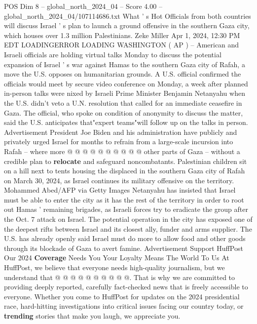 \begin{textsample}{POS Dim 8 – global\_north\_2024\_04 – Score 4.00 – global\_north\_2024\_04/107114686.txt}  \label{ex:f8_pos_319}
What ' s Hot Officials from both countries will discuss Israel ' s plan to launch a ground offensive in the southern Gaza city, which houses over 1.3 million Palestinians.
Zeke Miller Apr 1, 2024, 12:30 PM EDT LOADINGERROR LOADING WASHINGTON ( AP ) -- American and Israeli officials are holding virtual talks Monday to discuss the potential expansion of Israel ' s war against Hamas to the southern Gaza city of Rafah, a move the U.S. opposes on humanitarian grounds.
A U.S. official confirmed the officials would meet by secure video conference on Monday, a week after planned in-person talks were nixed by Israeli Prime Minister Benjamin Netanyahu when the U.S. didn't veto a U.N. resolution that called for an immediate ceasefire in Gaza.
The official, who spoke on condition of anonymity to discuss the matter, said the U.S. anticipates that"expert teams"will follow up on the talks in person.
Advertisement President Joe Biden and his administration have publicly and privately urged Israel for months to refrain from a large-scale incursion into Rafah -- where more @ @ @ @ @ @ @ @ @ @ other parts of Gaza -- without a credible plan to \textbf{relocate} and safeguard noncombatants.
Palestinian children sit on a hill next to tents housing the displaced in the southern Gaza city of Rafah on March 30, 2024, as Israel continues its military offensive on the territory.
Mohammed Abed/AFP via Getty Images Netanyahu has insisted that Israel must be able to enter the city as it has the rest of the territory in order to root out Hamas ' remaining brigades, as Israeli forces try to eradicate the group after the Oct. 7 attack on Israel.
The potential operation in the city has exposed one of the deepest rifts between Israel and its closest ally, funder and arms supplier.
The U.S. has already openly said Israel must do more to allow food and other goods through its blockade of Gaza to avert famine.
Advertisement Support HuffPost Our 2024 \textbf{Coverage} Needs You Your Loyalty Means The World To Us At HuffPost, we believe that everyone needs high-quality journalism, but we understand that @ @ @ @ @ @ @ @ @ @.
That is why we are committed to providing deeply reported, carefully fact-checked news that is freely accessible to everyone.
Whether you come to HuffPost for updates on the 2024 presidential race, hard-hitting investigations into critical issues facing our country today, or \textbf{trending} stories that make you laugh, we appreciate you.

\end{textsample}
